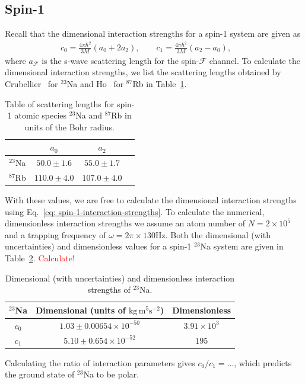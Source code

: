 \subsection{Spin-1}
Recall that the dimensional interaction strengths for a spin-1 system are given
as
\begin{align}\label{eq: spin-1-interaction-strengths}
    c_0 = \frac{4\pi\hbar^2}{3M}(a_0+2a_2), \qquad
    c_1 = \frac{4\pi\hbar^2}{3M}(a_2-a_0), \qquad
\end{align}
where \(a_\mathcal{F}\) is the s-wave scattering length for the
spin-\(\mathcal{F}\) channel.
To calculate the dimensional interaction strengths, we list the scattering
lengths obtained by Crubellier~\cite{Crubellier1999} for \( ^{23}\)Na and
Ho~\cite{Ho1998} for \( ^{87}\)Rb in
Table~\ref{table: scaterring-lengths-spin-1}.
\begin{table}[htbp]
    \centering
    \begin{tabular}{ cccc } 
     \toprule
      & \(a_0\) & \(a_2\) \\
      \midrule
      \( ^{23}\)Na & \(50.0\pm 1.6\) & \(55.0\pm 1.7\) \\ 
      \( ^{87}\)Rb & \(110.0\pm 4.0\) & \(107.0\pm 4.0\) \\
      \bottomrule
    \end{tabular}
    \caption{\label{table: scaterring-lengths-spin-1}Table of scattering lengths
    for spin-1 atomic species \( ^{23}\)Na and \( ^{87}\)Rb in units of the Bohr
    radius.}
\end{table}
With these values, we are free to calculate the dimensional interaction
strengths using Eq.~\eqref{eq: spin-1-interaction-strengths}.
To calculate the numerical, dimensionless interaction strengths we assume an
atom number of \(N = 2\times10^5\) and a trapping frequency of
\(\omega = 2\pi \times 130\)Hz.
Both the dimensional (with uncertainties) and dimensionless values for a spin-1
\( ^{23}\)Na system are given in Table~\ref{table: spin-1-interactions-sodium}.
\textcolor{red}{Calculate!}
\begin{table}[!htbp]
    \centering
    \begin{tabular}{ccc}
        \toprule
        \( ^{23}\)Na & Dimensional (units of \(\text{kg}\, \text{m}^5
        \text{s}^{-2}\)) & Dimensionless \\
        \midrule
        \(c_0\) & \(1.03 \pm 0.00654 \times 10^{-50}\) & \(3.91\times10^3\) \\
        \(c_1\) & \(5.10 \pm 0.654 \times 10^{-52}\) & \(195\) \\
        \bottomrule
    \end{tabular}
    \caption{\label{table: spin-1-interactions-sodium}Dimensional (with
    uncertainties) and dimensionless interaction strengths of \( ^{23}\)Na.}
\end{table}
Calculating the ratio of interaction parameters gives \(c_0/c_1=\ldots \),
which predicts the ground state of \( ^{23}\)Na to be polar.

